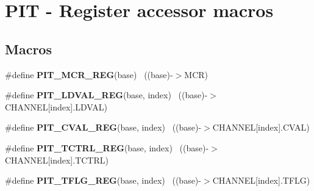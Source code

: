 \hypertarget{group___p_i_t___register___accessor___macros}{}\section{P\+I\+T -\/ Register accessor macros}
\label{group___p_i_t___register___accessor___macros}
\subsection*{Macros}
\begin{DoxyCompactItemize}
\item 
\hypertarget{group___p_i_t___register___accessor___macros_ga557d2712a651961dcd5ffc4f04673239}{}\#define {\bfseries P\+I\+T\+\_\+\+M\+C\+R\+\_\+\+R\+E\+G}(base)                                            ~((base)-\/$>$M\+C\+R)\label{group___p_i_t___register___accessor___macros_ga557d2712a651961dcd5ffc4f04673239}

\item 
\hypertarget{group___p_i_t___register___accessor___macros_ga2fe8b64df48316de72596736de1bbb00}{}\#define {\bfseries P\+I\+T\+\_\+\+L\+D\+V\+A\+L\+\_\+\+R\+E\+G}(base,  index)                            ~((base)-\/$>$C\+H\+A\+N\+N\+E\+L\mbox{[}index\mbox{]}.L\+D\+V\+A\+L)\label{group___p_i_t___register___accessor___macros_ga2fe8b64df48316de72596736de1bbb00}

\item 
\hypertarget{group___p_i_t___register___accessor___macros_ga0513f6bb6550d10e2877f1918dfdc80e}{}\#define {\bfseries P\+I\+T\+\_\+\+C\+V\+A\+L\+\_\+\+R\+E\+G}(base,  index)                              ~((base)-\/$>$C\+H\+A\+N\+N\+E\+L\mbox{[}index\mbox{]}.C\+V\+A\+L)\label{group___p_i_t___register___accessor___macros_ga0513f6bb6550d10e2877f1918dfdc80e}

\item 
\hypertarget{group___p_i_t___register___accessor___macros_ga4c2f72ad95fb4104612b319ce7a7d4d9}{}\#define {\bfseries P\+I\+T\+\_\+\+T\+C\+T\+R\+L\+\_\+\+R\+E\+G}(base,  index)                            ~((base)-\/$>$C\+H\+A\+N\+N\+E\+L\mbox{[}index\mbox{]}.T\+C\+T\+R\+L)\label{group___p_i_t___register___accessor___macros_ga4c2f72ad95fb4104612b319ce7a7d4d9}

\item 
\hypertarget{group___p_i_t___register___accessor___macros_ga79831c0452f96ca1b71292189ad382eb}{}\#define {\bfseries P\+I\+T\+\_\+\+T\+F\+L\+G\+\_\+\+R\+E\+G}(base,  index)                              ~((base)-\/$>$C\+H\+A\+N\+N\+E\+L\mbox{[}index\mbox{]}.T\+F\+L\+G)\label{group___p_i_t___register___accessor___macros_ga79831c0452f96ca1b71292189ad382eb}


\end{DoxyCompactItemize}
